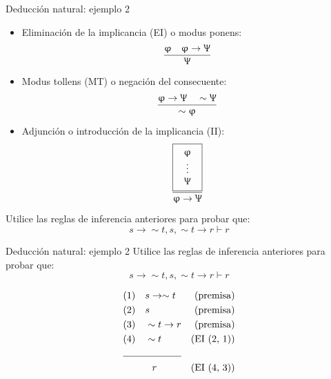 \documentclass{beamer}
\begin{document}
\begin{frame}{Deducción natural: ejemplo 2}
  \begin{itemize}
    \item Eliminación de la implicancia (EI) o modus ponens:
    $$\dfrac{\upvarphi \quad \upvarphi \rightarrow \Uppsi}{\Uppsi}$$

    \item Modus tollens (MT) o negación del consecuente:
    $$\dfrac{\upvarphi \rightarrow \Uppsi \quad \sim \Uppsi}{\sim \upvarphi}$$

    \item Adjunción o introducción de la implicancia (II):
          \begin{equation*}
            \frac{
              \fbox{
                $\begin{array}{c}
                  \upvarphi \\
                  \vdots \\
                  \Uppsi
                \end{array}$
              }
            }{\upvarphi \rightarrow \Uppsi}
          \end{equation*}
  \end{itemize}

  Utilice las reglas de inferencia anteriores para probar que:
  $$s \rightarrow \sim t, s, \sim t \rightarrow r \vdash r$$
\end{frame}


\begin{frame}{Deducción natural: ejemplo 2}
  Utilice las reglas de inferencia anteriores para probar que:
  $$s \rightarrow \sim t, s, \sim t \rightarrow r \vdash r$$

  \begin{align*}
    &(1) \quad s \rightarrow \sim t &\text{(premisa)}\\
    &(2) \quad s &\text{(premisa)}\\
    &(3) \quad \sim t \rightarrow r &\text{(premisa)}\\
    &(4) \quad \sim t &\text{(EI (2, 1))}\\
    \cline{1-2}
    &\qquad \quad r &\text{(EI (4, 3))}
  \end{align*}
\end{frame}
\end{document}
